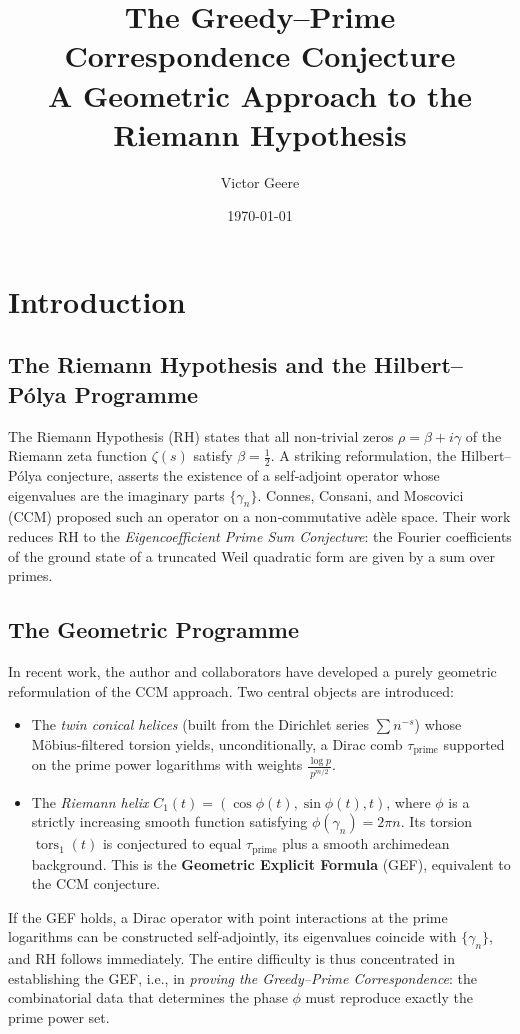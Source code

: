 \documentclass[12pt,a4paper,twoside,openright]{book}
\title{\bf The Greedy--Prime Correspondence Conjecture\\
A Geometric Approach to the Riemann Hypothesis}
\author{Victor Geere}
\date{\today}
\begin{document}
\maketitle
\tableofcontents

\chapter{Introduction}
\section{The Riemann Hypothesis and the Hilbert--P\'olya Programme}
The Riemann Hypothesis (RH) states that all non‑trivial zeros \(\rho = \beta + i\gamma\) of the Riemann zeta function \(\zeta(s)\) satisfy \(\beta = \frac12\).  A striking reformulation, the Hilbert--P\'olya conjecture, asserts the existence of a self‑adjoint operator whose eigenvalues are the imaginary parts \(\{\gamma_n\}\).  Connes, Consani, and Moscovici (CCM) \cite{CCM} proposed such an operator on a non‑commutative adèle space.  Their work reduces RH to the \emph{Eigencoefficient Prime Sum Conjecture}: the Fourier coefficients of the ground state of a truncated Weil quadratic form are given by a sum over primes.

\section{The Geometric Programme}
In recent work, the author and collaborators have developed a purely geometric reformulation of the CCM approach.  Two central objects are introduced:
\begin{itemize}
\item The \emph{twin conical helices} (built from the Dirichlet series \(\sum n^{-s}\)) whose M\"obius‑filtered torsion yields, unconditionally, a Dirac comb \(\tau_{\text{prime}}\) supported on the prime power logarithms with weights \(\frac{\log p}{p^{m/2}}\).
\item The \emph{Riemann helix} \(C_1(t) = (\cos\phi(t),\sin\phi(t),t)\), where \(\phi\) is a strictly increasing smooth function satisfying \(\phi(\gamma_n)=2\pi n\).  Its torsion \(\operatorname{tors}_1(t)\) is conjectured to equal \(\tau_{\text{prime}}\) plus a smooth archimedean background.  This is the \textbf{Geometric Explicit Formula} (GEF), equivalent to the CCM conjecture.
\end{itemize}
If the GEF holds, a Dirac operator with point interactions at the prime logarithms can be constructed self‑adjointly, its eigenvalues coincide with \(\{\gamma_n\}\), and RH follows immediately.  The entire difficulty is thus concentrated in establishing the GEF, i.e., in \emph{proving the Greedy--Prime Correspondence}: the combinatorial data that determines the phase \(\phi\) must reproduce exactly the prime power set.
\end{document}
